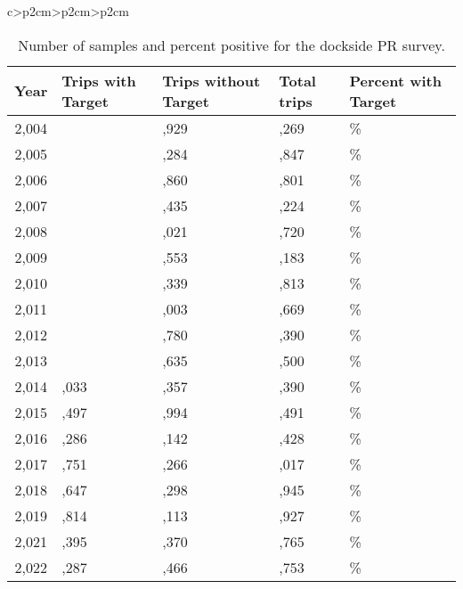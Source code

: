\documentclass[11pt,
  letterpaper,
]{article}
\begin{document}
\begin{longtable}[t]{c>{\centering\arraybackslash}p{2cm}>{\centering\arraybackslash}p{2cm}>{\centering\arraybackslash}p{2cm}}
\begin{table}[H]
\centering\centering\centering
\caption{\label{tab:pr-percentpos}Number of samples and percent positive for the dockside PR survey.}
\centering
\fontsize{10}{12}\selectfont
\fontsize{10}{12}\selectfont
\begin{tabular}[t]{c>{\centering\arraybackslash}p{1.6cm}>{\centering\arraybackslash}p{1.6cm}>{\centering\arraybackslash}p{1.6cm}>{\centering\arraybackslash}p{1.6cm}}
\toprule
Year & Trips with Target & Trips without Target & Total trips & Percent with Target\\
\midrule
2,004 & 340 & 2,929 & 3,269 & 10.4\%\\
2,005 & 563 & 4,284 & 4,847 & 11.6\%\\
2,006 & 941 & 4,860 & 5,801 & 16.2\%\\
2,007 & 789 & 3,435 & 4,224 & 18.7\%\\
2,008 & 699 & 3,021 & 3,720 & 18.8\%\\
2,009 & 630 & 3,553 & 4,183 & 15.1\%\\
2,010 & 474 & 2,339 & 2,813 & 16.9\%\\
2,011 & 666 & 3,003 & 3,669 & 18.2\%\\
2,012 & 610 & 3,780 & 4,390 & 13.9\%\\
2,013 & 865 & 4,635 & 5,500 & 15.7\%\\
2,014 & 1,033 & 5,357 & 6,390 & 16.2\%\\
2,015 & 1,497 & 4,994 & 6,491 & 23.1\%\\
2,016 & 1,286 & 4,142 & 5,428 & 23.7\%\\
2,017 & 1,751 & 3,266 & 5,017 & 34.9\%\\
2,018 & 1,647 & 3,298 & 4,945 & 33.3\%\\
2,019 & 1,814 & 3,113 & 4,927 & 36.8\%\\
2,021 & 1,395 & 3,370 & 4,765 & 29.3\%\\
2,022 & 1,287 & 3,466 & 4,753 & 27.1\%\\
\bottomrule
\end{tabular}
\end{table}


\end{longtable}
\end{document}
